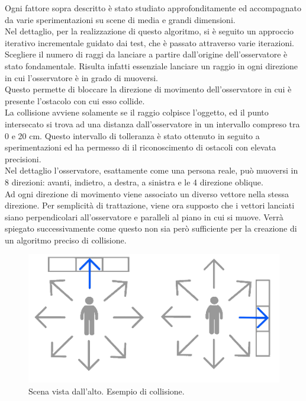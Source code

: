 Ogni fattore sopra descritto è stato studiato approfonditamente ed accompagnato da varie sperimentazioni su scene di media e grandi dimensioni.
\\
Nel dettaglio, per la realizzazione di questo algoritmo, si è seguito un approccio iterativo incrementale guidato dai test, che è passato attraverso varie iterazioni.
Scegliere il numero di raggi da lanciare a partire dall’origine dell’osservatore è stato fondamentale. Risulta infatti essenziale lanciare un raggio in ogni direzione in cui l’osservatore è in grado di muoversi.
\\
Questo permette di bloccare la direzione di movimento dell’osservatore in cui è presente l’ostacolo con cui esso collide.
\\
La collisione avviene solamente se il raggio colpisce l’oggetto, ed il punto intersecato si trova ad una distanza dall’osservatore in un intervallo compreso tra 0 e 20 cm. 
Questo intervallo di tolleranza è stato ottenuto in seguito a sperimentazioni ed ha permesso di il riconoscimento di ostacoli con elevata precisioni.
\\
Nel dettaglio l’osservatore, esattamente come una persona reale, può muoversi in 8 direzioni: avanti, indietro, a destra, a sinistra e le 4 direzione oblique.
\\
Ad ogni direzione di movimento viene associato un diverso vettore nella stessa direzione.
Per semplicità di trattazione, viene ora supposto che i vettori lanciati siano perpendicolari all’osservatore e paralleli al piano in cui si muove. Verrà spiegato successivamente come questo non sia però sufficiente per la creazione di un algoritmo preciso di collisione.
\newpage
\begin{figure}[htb]
 \centering
 \includegraphics[width=0.8\linewidth]{images/chapter_navigazione_scena/collisioni1.png}\hfill
 \caption[Esempio di collisione.]{Scena vista dall'alto. Esempio di collisione.}
 \label{fig:navigazione_scena_collisioni1}
\end{figure}
